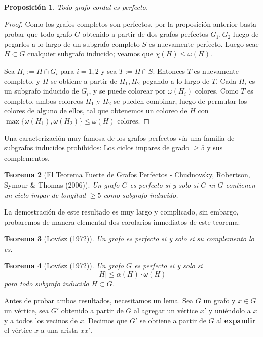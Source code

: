 \documentclass[12pt]{report}
\theoremstyle{plain}
\newtheorem{theorem}{Teorema}[section]
\newtheorem{proposition}[theorem]{Proposición}
\theoremstyle{definition}
\newcommand{\abs}[1]{\left \vert #1 \right \vert}
\renewcommand{\bar}[1]{\overline{#1}}
\begin{document}
\begin{proposition}
Todo grafo cordal es perfecto.
\end{proposition}
\begin{proof}
Como los grafos completos son perfectos, por la proposición anterior basta probar que todo grafo $G$ obtenido a partir de dos grafos perfectos $G_1,G_2$ luego de pegarlos a lo largo de un subgrafo completo $S$ es nuevamente perfecto. Luego seae $H \subset G$ cualquier subgrafo inducido; veamos que $\chi (H) \leq \omega (H)$.

Sea $H_i := H \cap G_i$ para $i =1,2$ y sea $T := H \cap S$. Entonces $T$ es nuevamente completo, y $H$ se obtiene a partir de $H_1,H_2$ pegando a lo largo de $T$. Cada $H_i$ es un subgrafo inducido de $G_i$, y se puede colorear por $\omega (H_i)$ colores. Como $T$ es completo, ambos coloreos $H_1$ y $H_2$ se pueden combinar, luego de permutar los colores de alguno de ellos, tal que obtenemos un coloreo de $H$ con $\max \{\omega (H_1), \omega(H_2) \} \leq \omega (H)$ colores.
\end{proof}

Una caracterización muy famosa de los grafos perfectos vía una familia de subgrafos inducidos prohibidos: Los ciclos impares de grado $\geq 5$ y sus complementos.

\begin{theorem}[El Teorema Fuerte de Grafos Perfectos - Chudnovsky, Robertson, Symour \& Thomas (2006)]
Un grafo $G$ es perfecto si y solo si $G$ ni $\bar G$ contienen un ciclo impar de longitud $\geq 5$ como subgrafo inducido.
\end{theorem}

La demostración de este resultado es muy largo y complicado, sin embargo, probaremos de manera elemental dos corolarios inmediatos de este teorema:

\begin{theorem}[Lovász (1972)]\label{th: lovasz 1 - todo grafo es perfecto si y solo si su complemento lo es}
Un grafo es perfecto si y solo si su complemento lo es.
\end{theorem}

\begin{theorem}[Lovász (1972)]
Un grafo $G$ es perfecto si y solo si
\[
    \abs H \leq \alpha (H) \cdot \omega (H)
\]
para todo subgrafo inducido $H \subset G$.
\end{theorem}

Antes de probar ambos resultados, necesitamos un lema. Sea $G$ un grafo y $x \in G$ un vértice, sea $G'$ obtenido a partir de $G$ al agregar un vértice $x'$ y uniéndolo a $x$ y a todos los vecinos de $x$. Decimos que $G'$ se obtiene a partir de $G$ al \textbf{expandir} el vértice $x$ a una arista $xx'$.
\end{document}
